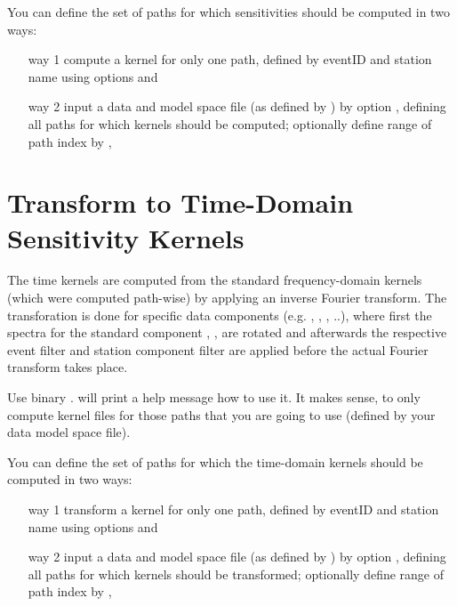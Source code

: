 You can define the set of paths for which sensitivities should be computed in two ways:
\begin{itemize}
\item[way 1] compute a kernel for only one path, defined by eventID and station name using options  
and 
\item[way 2] input a data and model space file (as defined by ) by option 
, defining all paths for which kernels should be computed; optionally define range of path index
by , 
\end{itemize}
%
\section{Transform to Time-Domain Sensitivity Kernels} \label{basic_steps,sec:compute_time_kernels}
%
The time kernels are computed from the standard frequency-domain kernels (which were computed path-wise)
by applying an inverse Fourier transform. The transforation is done for specific data components
(e.g. , , , ..), where first the spectra for the standard component 
, ,  are rotated and afterwards the respective event filter and station component
filter are applied before the actual Fourier transform takes place.

Use binary .  will print a help message how to use it.
It makes sense, to only compute kernel files for those paths that you are going to use (defined by
your data model space file).

You can define the set of paths for which the time-domain kernels should be computed in two ways:
\begin{itemize}
\item[way 1] transform a kernel for only one path, defined by eventID and station name using options  
and 
\item[way 2] input a data and model space file (as defined by ) by option 
, defining all paths for which kernels should be transformed; optionally define range of path index
by , 
\end{itemize}
%
